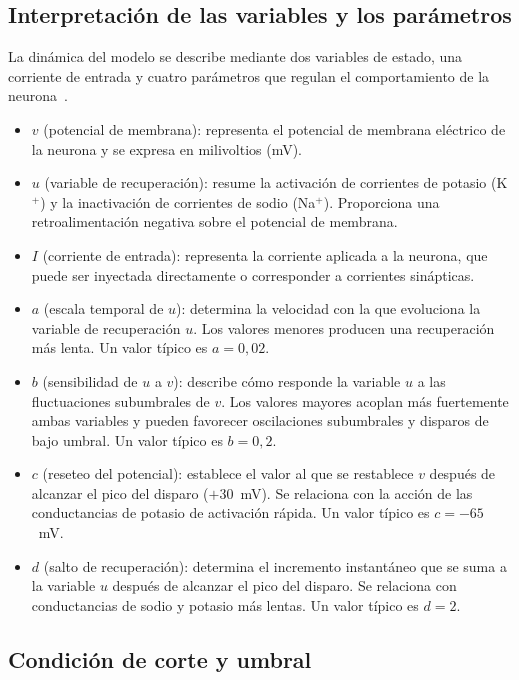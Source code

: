 \documentclass[10pt,a4paper,twocolumn]{article}
\begin{document}
\subsection*{Interpretación de las variables y los parámetros}

La dinámica del modelo se describe mediante dos variables de estado, una corriente de
entrada y cuatro parámetros que regulan el comportamiento de la neurona~\cite{izhikevich2003}.
\begin{itemize}[leftmargin=*,itemsep=1pt,topsep=2pt]
  \item $v$ (potencial de membrana): representa el potencial de membrana eléctrico de
  la neurona y se expresa en milivoltios (mV).
  \item $u$ (variable de recuperación): resume la activación de corrientes de potasio
  (K$^{+}$) y la inactivación de corrientes de sodio (Na$^{+}$). Proporciona una
  retroalimentación negativa sobre el potencial de membrana.
  \item $I$ (corriente de entrada): representa la corriente aplicada a la neurona, que
  puede ser inyectada directamente o corresponder a corrientes sinápticas.
  \item $a$ (escala temporal de $u$): determina la velocidad con la que evoluciona la
  variable de recuperación $u$. Los valores menores producen una recuperación más
  lenta. Un valor típico es $a = 0,02$.
  \item $b$ (sensibilidad de $u$ a $v$): describe cómo responde la variable $u$ a las
  fluctuaciones subumbrales de $v$. Los valores mayores acoplan más fuertemente ambas
  variables y pueden favorecer oscilaciones subumbrales y disparos de bajo umbral. Un
  valor típico es $b = 0,2$.
  \item $c$ (reseteo del potencial): establece el valor al que se restablece $v$
  después de alcanzar el pico del disparo ($+30$~mV). Se relaciona con la acción de
  las conductancias de potasio de activación rápida. Un valor típico es
  $c = -65$~mV.
  \item $d$ (salto de recuperación): determina el incremento instantáneo que se suma a
  la variable $u$ después de alcanzar el pico del disparo. Se relaciona con
  conductancias de sodio y potasio más lentas. Un valor típico es $d = 2$.
\end{itemize}

\subsection*{Condición de corte y umbral}
\end{document}

